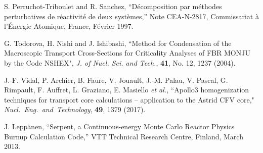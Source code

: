 \begin{thebibliography}{99}
S. Perruchot-Triboulet and R. Sanchez, ``D\'ecomposition par m\'ethodes perturbatives de r\'eactivit\'e de deux syst\`emes,'' Note CEA-N-2817, Commissariat \`a l'\'Energie Atomique, France, F\'evrier 1997.

G. Todorova, H. Nishi and J. Ishibashi, ``Method for Condensation of the Macroscopic Transport Cross-Sections for Criticality Analyses of FBR MONJU by the Code NSHEX", {\sl J. of Nucl. Sci. and Tech.},
{\bf 41}, No. 12, 1237 (2004).

J.-F. Vidal, P. Archier, B. Faure, V. Jouault, J.-M. Palau, V. Pascal, G. Rimpault, F. Auffret, L. Graziano, E. Masiello {\sl et al.}, ``Apollo3
homogenization techniques for transport core calculations -- application to the Astrid CFV core," {\sl Nucl.~Eng.~and~Technology}, {\bf 49}, 1379 (2017).

J. Lepp\"anen, ``Serpent, a Continuous-energy Monte Carlo Reactor Physics Burnup Calculation Code,'' VTT Technical Research Centre, Finland, March 2013.

\end{thebibliography}
